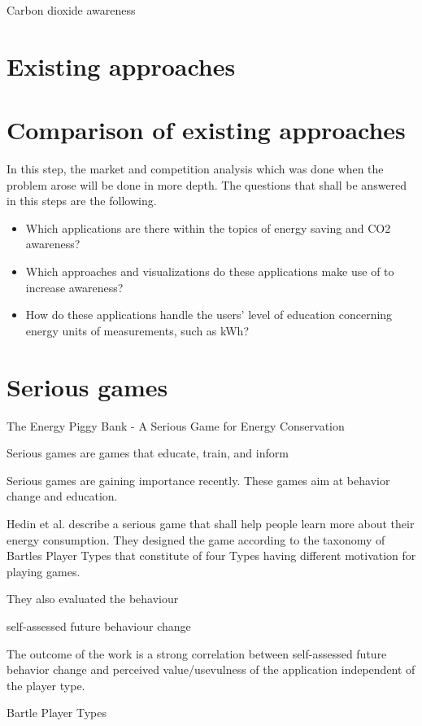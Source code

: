 Carbon dioxide awareness

\cite{mohammadmoradieffectiveness}

\section{Existing approaches}

\section{Comparison of existing approaches}
In this step, the market and competition analysis which was done when the problem arose will be done in more depth. The questions that shall be answered in this steps are the following.
\begin{itemize}
	\item Which applications are there within the topics of energy saving and CO2 awareness?
	\item Which approaches and visualizations do these applications make use of to increase awareness?
	\item How do these applications handle the users' level of education concerning energy units of measurements, such as kWh?
\end{itemize}

\section{Serious games}

The Energy Piggy Bank - A Serious Game for Energy Conservation

Serious games are games that educate, train, and inform

Serious games are gaining importance recently. These games aim at behavior change and education.

Hedin et al. \cite{Bjorn1165339} describe a serious game that shall help people learn more about their energy consumption. They designed the game according to the taxonomy of Bartles Player Types that constitute of four Types having different motivation for playing games.


They also evaluated the behaviour 

self-assessed future behaviour change 

The outcome of the work is a strong correlation between self-assessed future behavior change and perceived value/usevulness of the application independent of the player type.

Bartle Player Types

